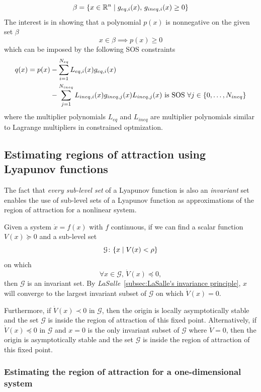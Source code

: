 \[
  \beta = \lbrace x \in \mathbb{R}^n \mid g_{eq,i}(x),\,g_{ineq,i}(x) \geq 0\rbrace
\]
The interest is in showing that a polynomial \(p(x)\) is nonnegative on the
given set \(\beta\)
\[
  x \in \beta \implies p(x) \geq 0
\]
which can be imposed by the following SOS constraints
\begin{align*}
  q(x) = p(x) &- \sum_{i=1}^{N_{eq}}L_{eq,i}(x)g_{eq,i}(x) \\ &-
  \sum_{j=1}^{N_{ineq}}L_{ineq,i}(x)g_{ineq,j}(x)
  L_{ineq,j}(x) \text{ is SOS } \forall j \in \lbrace0,\ldots,N_{ineq}\rbrace
\end{align*} 
where the multiplier polynomials \(L_{eq}\) and \(L_{ineq}\) are multiplier
polynomials similar to Lagrange multipliers in constrained optmization.

\subsection{Estimating regions of attraction using Lyapunov functions}

The fact that \textit{every sub-level set} of a Lyapunov function is also an
\textit{invariant} set enables the use of sub-level sets of a Lyapunov function
as approximations of the region of attraction for a nonlinear system.

\begin{theorem}
  Given a system \(\dot{x} = f(x)\) with \(f\) continuous, if we can find a
  scalar function \(V(x) \succeq 0 \) and a sub-level set
  \[
    \mathcal{G} \colon \lbrace x \mid V(x) < \rho\rbrace
  \]
  on which
  \[
    \forall x \in \mathcal{G},\,\dot{V}(x) \preceq 0,
  \]
  then \(\mathcal{G}\) is an invariant set. By
  \textit{LaSalle}~\ref{subsec:LaSalle's invariance principle}, \(x\) will
  converge to the largest invariant subset of \(\mathcal{G}\) on which
  \(\dot{V}(x) = 0\).

  Furthermore, if \(\dot{V}(x) \prec 0\) in \(\mathcal{G}\), then the origin is
  locally asymptotically stable and the set \(\mathcal{G}\) is inside the region
  of attraction of this fixed point. Alternatively, if \(\dot{V}(x) \preceq 0 \)
  in \(\mathcal{G}\) and \(x = 0\) is the only invariant subset of
  \(\mathcal{G}\) where \(\dot{V} = 0\), then the origin is asymptotically
  stable and the set \(\mathcal{G}\) is inside the region of attraction of this
  fixed point.
\end{theorem}
\cite{tedrakeUnderactuatedRoboticsAlgorithms2019}

\subsubsection{Estimating the region of attraction for a one-dimensional system}
\label{subsec:Estimating the region of attraction for a one-dimensional system}

